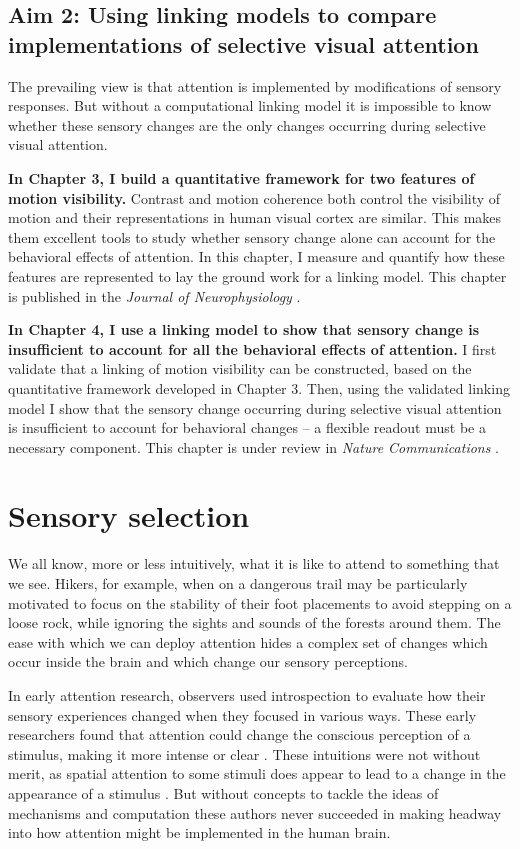 \subsection{Aim 2: Using linking models to compare implementations of selective visual attention}

The prevailing view is that attention is implemented by modifications of sensory responses. But without a computational linking model it is impossible to know whether these sensory changes are the only changes occurring during selective visual attention. 

\textbf{In Chapter 3, I build a quantitative framework for two features of motion visibility.} Contrast and motion coherence both control the visibility of motion and their representations in human visual cortex are similar. This makes them excellent tools to study whether sensory change alone can account for the behavioral effects of attention. In this chapter, I measure and quantify how these features are represented to lay the ground work for a linking model. This chapter is published in the \textit{Journal of Neurophysiology} \citep{Birman2018-sp}.

\textbf{In Chapter 4, I use a linking model to show that sensory change is insufficient to account for all the behavioral effects of attention.} I first validate that a linking of motion visibility can be constructed, based on the quantitative framework developed in Chapter 3. Then, using the validated linking model I show that the sensory change occurring during selective visual attention is insufficient to account for behavioral changes -- a flexible readout must be a necessary component. This chapter is under review in \textit{Nature Communications} \citep{Birman_undated-vk}.

\section{Sensory selection}

We all know, more or less intuitively, what it is like to attend to something that we see. Hikers, for example, when on a dangerous trail may be particularly motivated to focus on the stability of their foot placements to avoid stepping on a loose rock, while ignoring the sights and sounds of the forests around them. The ease with which we can deploy attention hides a complex set of changes which occur inside the brain and which change our sensory perceptions.

In early attention research, observers used introspection to evaluate how their sensory experiences changed when they focused in various ways. These early researchers found that attention could change the conscious perception of a stimulus, making it more intense or clear \citep{Helmholtz1924-rl,James1981-cj,Kuelpe1902-qz,Titchener1908-bx}. These intuitions were not without merit, as spatial attention to some stimuli does appear to lead to a change in the appearance of a stimulus \citep{Carrasco2018-sb}. But without concepts to tackle the ideas of mechanisms and computation these authors never succeeded in making headway into how attention might be implemented in the human brain. 

